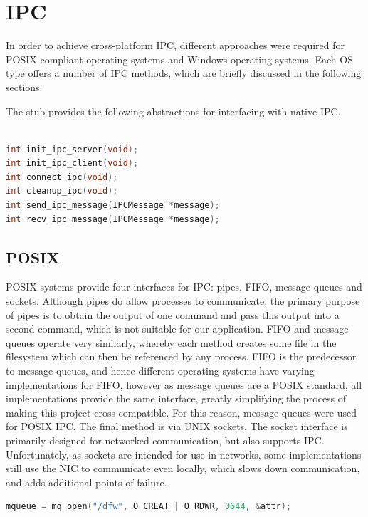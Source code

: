 \documentclass[a4paper, 11pt]{report}
\begin{document}
\section{IPC}
In order to achieve cross-platform \acrshort{IPC}, different approaches were required for \acrfull{POSIX} compliant operating systems and Windows\cite{windows} operating systems. Each \acrshort{OS} type offers a number of \acrshort{IPC} methods, which are briefly discussed in the following sections.

The \gls{stub} provides the following abstractions for interfacing with native \acrshort{IPC}.\\\\

\begin{lstlisting}[language=c,style=c,caption=IPC API]
int init_ipc_server(void);
int init_ipc_client(void);
int connect_ipc(void);
int cleanup_ipc(void);
int send_ipc_message(IPCMessage *message);
int recv_ipc_message(IPCMessage *message);
\end{lstlisting}

\subsection{POSIX} \label{posixipc}
\acrshort{POSIX} systems provide four interfaces for \acrshort{IPC}: pipes, FIFO, message queues and sockets. Although pipes do allow processes to communicate, the primary purpose of pipes is to obtain the output of one command and pass this output into a second command, which is not suitable for our application. FIFO and message queues operate very similarly, whereby each method creates some file in the filesystem which can then be referenced by any process. FIFO is the predecessor to message queues, and hence different operating systems have varying implementations for FIFO, however as message queues are a \acrshort{POSIX} standard, all implementations provide the same interface, greatly simplifying the process of making this project cross compatible. For this reason, message queues were used for \acrshort{POSIX} \acrshort{IPC}. The final method is via UNIX sockets. The socket interface is primarily designed for networked communication, but also supports \acrshort{IPC}. Unfortunately, as sockets are intended for use in networks, some implementations still use the \acrshort{NIC} to communicate even locally, which slows down communication, and adds additional points of failure.

\begin{lstlisting}[language=c,style=c,caption=Creating the message queue on a POSIX OS]
mqueue = mq_open("/dfw", O_CREAT | O_RDWR, 0644, &attr);
\end{lstlisting}
\end{document}
